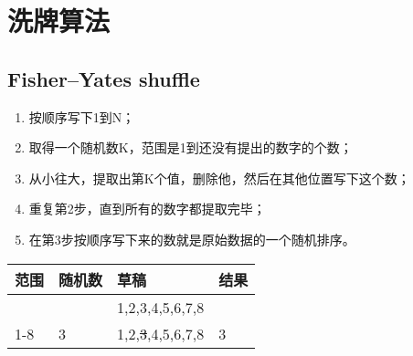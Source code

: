 \chapter{洗牌算法}


\section{Fisher–Yates shuffle}

\begin{enumerate}
\item 按顺序写下1到N；
\item 取得一个随机数K，范围是1到还没有提出的数字的个数；
\item 从小往大，提取出第K个值，删除他，然后在其他位置写下这个数；
\item 重复第2步，直到所有的数字都提取完毕；
\item 在第3步按顺序写下来的数就是原始数据的一个随机排序。
\end{enumerate}

\begin{center}
\begin{tabular}{|l|l|l|l|}
	\hline
	范围 & 随机数 & 草稿 & 结果\\
	\hline
	 & &1,2,3,4,5,6,7,8& \\
	\hline
	1-8 & 3 & 1,2,\sout{3},4,5,6,7,8 & 3\\
	\hline
	
\end{tabular}
\end{center}
